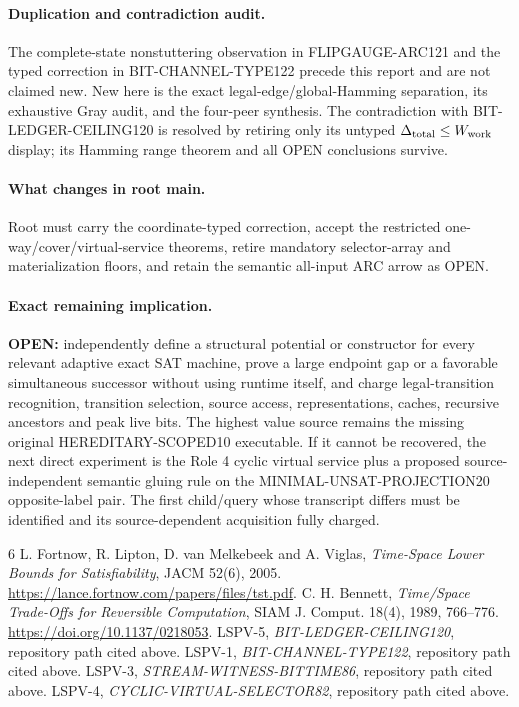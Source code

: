 \documentclass[11pt]{article}
\begin{document}
\paragraph{Duplication and contradiction audit.}
The complete-state nonstuttering observation in FLIPGAUGE-ARC121 and the
typed correction in BIT-CHANNEL-TYPE122 precede this report and are not
claimed new.  New here is the exact legal-edge/global-Hamming separation,
its exhaustive Gray audit, and the four-peer synthesis.  The contradiction
with BIT-LEDGER-CEILING120 is resolved by retiring only its untyped
$\Delta_{\rm total}\le W_{\rm work}$ display; its Hamming range theorem and
all OPEN conclusions survive.

\paragraph{What changes in root main.}
Root must carry the coordinate-typed correction, accept the restricted
one-way/cover/virtual-service theorems, retire mandatory selector-array and
materialization floors, and retain the semantic all-input ARC arrow as OPEN.

\paragraph{Exact remaining implication.}
\textbf{OPEN:} independently define a structural potential or constructor
for every relevant adaptive exact SAT machine, prove a large endpoint gap or
a favorable simultaneous successor without using runtime itself, and charge
legal-transition recognition, transition selection, source access,
representations, caches, recursive ancestors and peak live bits.  The highest
value source remains the missing original HEREDITARY-SCOPED10 executable.  If
it cannot be recovered, the next direct experiment is the Role 4 cyclic
virtual service plus a proposed source-independent semantic gluing rule on
the MINIMAL-UNSAT-PROJECTION20 opposite-label pair.  The first child/query
whose transcript differs must be identified and its source-dependent
acquisition fully charged.

\begin{thebibliography}{6}
 L. Fortnow, R. Lipton, D. van Melkebeek and A. Viglas,
\emph{Time-Space Lower Bounds for Satisfiability}, JACM 52(6), 2005.
\url{https://lance.fortnow.com/papers/files/tst.pdf}.
 C. H. Bennett, \emph{Time/Space Trade-Offs for Reversible
Computation}, SIAM J. Comput. 18(4), 1989, 766--776.
\url{https://doi.org/10.1137/0218053}.
 LSPV-5, \emph{BIT-LEDGER-CEILING120}, repository path cited
above.
 LSPV-1, \emph{BIT-CHANNEL-TYPE122}, repository path cited
above.
 LSPV-3, \emph{STREAM-WITNESS-BITTIME86}, repository path
cited above.
 LSPV-4, \emph{CYCLIC-VIRTUAL-SELECTOR82}, repository path
cited above.
\end{thebibliography}
\end{document}
